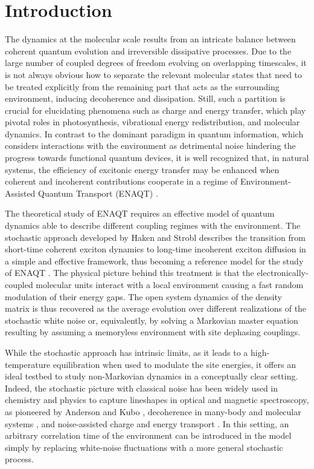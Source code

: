 \documentclass[12pt, amsmath, amssymb, graphicx]{iopart}
\begin{document}
\section{Introduction}

The dynamics at the molecular scale results from an intricate balance between coherent quantum evolution and irreversible dissipative processes. Due to the large number of coupled degrees of freedom evolving on overlapping timescales, it is not always obvious how to separate the relevant molecular states that need to be treated explicitly from the remaining part that acts as the surrounding environment, inducing decoherence and dissipation. Still, such a partition is crucial for elucidating phenomena such as charge and energy transfer, which play pivotal roles in photosynthesis, vibrational energy redistribution, and molecular dynamics. In contrast to the dominant paradigm in quantum information, which considers interactions with the environment as detrimental noise hindering the progress towards functional quantum devices, it is well recognized that, in natural systems, the efficiency of excitonic energy transfer may be enhanced when coherent and incoherent contributions cooperate in a regime of Environment-Assisted Quantum Transport (ENAQT) \cite{Rebentrost2009, Zerah-Harush2018, Li2022, Coates2023, Alterman2024}.

The theoretical study of ENAQT requires an effective model of quantum dynamics able to describe different coupling regimes with the environment. The stochastic approach developed by Haken and Strobl \cite{Haken1973} describes the transition from short-time coherent exciton dynamics to long-time incoherent exciton diffusion in a simple and effective framework, thus becoming a reference model for the study of ENAQT \cite{Rebentrost2009, Wu2012, Wu2013, Moix2013, Fujita2014, Fujita2012, Liu2016, Dutta2016, Potocnik2018, Bondarenko2020, Li2022}.
The physical picture behind this treatment is that the electronically\hyphen coupled molecular units interact with a local environment causing a fast random modulation of their energy gaps. The open system dynamics of the density matrix is thus recovered as the average evolution over different realizations of the stochastic white noise or, equivalently, by solving a Markovian master equation resulting by assuming a memoryless environment with site dephasing couplings.

While the stochastic approach has intrinsic limits, as it leads to a high\hyphen temperature equilibration when used to modulate the site energies, it offers an ideal testbed to study non\hyphen Markovian dynamics in a conceptually clear setting. Indeed, the stochastic picture with classical noise has been widely used in chemistry and physics to capture lineshapes in optical and magnetic spectroscopy, as pioneered by Anderson and Kubo \cite{W.Anderson1954, Kubo1954}, decoherence in many\hyphen body and molecular systems \cite{Chenu2017, Gu2019}, and noise\hyphen assisted charge and energy transport \cite{Liu2016, Dutta2016, Pfluegl2000, Dijkstra2015, Fujita2012, Giusteri2017, Coccia2018}.
In this setting, an arbitrary correlation time of the environment can be introduced in the model simply by replacing white\hyphen noise fluctuations with a more general stochastic process.
\end{document}
